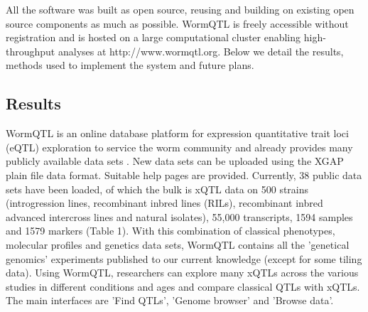 All the software was built as open source, reusing and building on existing open source components 
as much as possible. WormQTL is freely accessible without registration and is hosted on a large 
computational cluster enabling high-throughput analyses at http://www.wormqtl.org. Below we detail 
the results, methods used to implement the system and future plans.

\subsection{Results}
WormQTL is an online database platform for expression quantitative trait loci (eQTL) exploration 
to service the worm community and already provides many publicly available data sets \cite{Rockman:2010, 
Doroszuk:2009, Li:2006, Li:2010, Gutteling:2007, Vinuela:2010, Elvin:2011, Vinuela:2012}. New data 
sets can be uploaded using the XGAP plain file data format. Suitable help pages are provided. 
Currently, 38 public data sets have been loaded, of which the bulk is xQTL data on 500 strains 
(introgression lines, recombinant inbred lines (RILs), recombinant inbred advanced intercross lines 
and natural isolates), 55,000 transcripts, 1594 samples and 1579 markers (Table 1). With this 
combination of classical phenotypes, molecular profiles and genetics data sets, WormQTL contains 
all the 'genetical genomics' experiments published to our current knowledge (except for some tiling 
data). Using WormQTL, researchers can explore many xQTLs across the various studies in different 
conditions and ages and compare classical QTLs with xQTLs. The main interfaces are 'Find QTLs', 
'Genome browser' and 'Browse data'.

